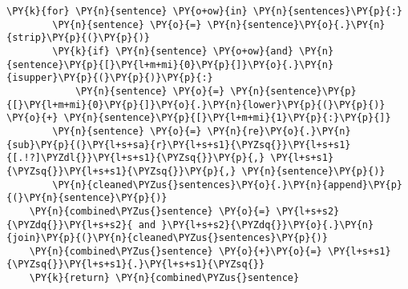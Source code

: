 \documentclass[11pt]{wseas}
\begin{document}
\begin{tcolorbox}[breakable, size=fbox, boxrule=1pt, pad at break*=1mm,colback=cellbackground, colframe=cellborder]
\begin{Verbatim}[commandchars=\\\{\}]
    \PY{k}{for} \PY{n}{sentence} \PY{o+ow}{in} \PY{n}{sentences}\PY{p}{:}
        \PY{n}{sentence} \PY{o}{=} \PY{n}{sentence}\PY{o}{.}\PY{n}{strip}\PY{p}{(}\PY{p}{)}
        \PY{k}{if} \PY{n}{sentence} \PY{o+ow}{and} \PY{n}{sentence}\PY{p}{[}\PY{l+m+mi}{0}\PY{p}{]}\PY{o}{.}\PY{n}{isupper}\PY{p}{(}\PY{p}{)}\PY{p}{:}
            \PY{n}{sentence} \PY{o}{=} \PY{n}{sentence}\PY{p}{[}\PY{l+m+mi}{0}\PY{p}{]}\PY{o}{.}\PY{n}{lower}\PY{p}{(}\PY{p}{)} \PY{o}{+} \PY{n}{sentence}\PY{p}{[}\PY{l+m+mi}{1}\PY{p}{:}\PY{p}{]}
        \PY{n}{sentence} \PY{o}{=} \PY{n}{re}\PY{o}{.}\PY{n}{sub}\PY{p}{(}\PY{l+s+sa}{r}\PY{l+s+s1}{\PYZsq{}}\PY{l+s+s1}{[.!?]\PYZdl{}}\PY{l+s+s1}{\PYZsq{}}\PY{p}{,} \PY{l+s+s1}{\PYZsq{}}\PY{l+s+s1}{\PYZsq{}}\PY{p}{,} \PY{n}{sentence}\PY{p}{)}
        \PY{n}{cleaned\PYZus{}sentences}\PY{o}{.}\PY{n}{append}\PY{p}{(}\PY{n}{sentence}\PY{p}{)}
    \PY{n}{combined\PYZus{}sentence} \PY{o}{=} \PY{l+s+s2}{\PYZdq{}}\PY{l+s+s2}{ and }\PY{l+s+s2}{\PYZdq{}}\PY{o}{.}\PY{n}{join}\PY{p}{(}\PY{n}{cleaned\PYZus{}sentences}\PY{p}{)}
    \PY{n}{combined\PYZus{}sentence} \PY{o}{+}\PY{o}{=} \PY{l+s+s1}{\PYZsq{}}\PY{l+s+s1}{.}\PY{l+s+s1}{\PYZsq{}}
    \PY{k}{return} \PY{n}{combined\PYZus{}sentence}
\end{Verbatim}
\end{tcolorbox}
\end{document}

